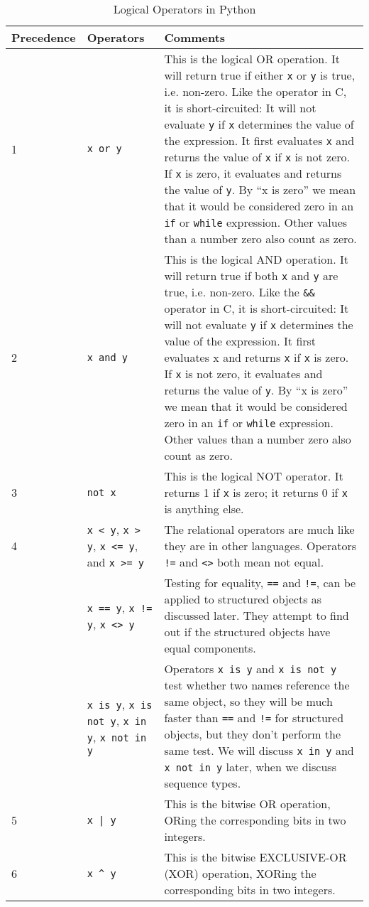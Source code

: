 \begin{longtable}{l|p{3cm}|p{7cm}}
\caption{Logical Operators in Python}
\label{table:logical-operators-python}\\
%
\toprule
Precedence & Operators & Comments \\
\midrule
  1 & \texttt{x or y} &  This is the logical OR operation.
It will return true if either \texttt{x} or \texttt{y} is true, i.e.
non-zero. Like the \texttt{\textbar{}\textbar{}} operator in C, it is
short-circuited: It will not evaluate \texttt{y} if \texttt{x} determines
the value of the expression. It first evaluates \texttt{x} and returns the
value of \texttt{x} if \texttt{x} is not zero. If \texttt{x} is zero, it
evaluates and returns the value of \texttt{y}. By ``x is zero'' we mean
that it would be considered zero in an \texttt{if} or \texttt{while}
expression. Other values than a number zero also count as zero. \\
%
\midrule
  2 & \texttt{x and y} & This is the logical AND operation.
It will return true if both \texttt{x} and \texttt{y} are true, i.e.
non-zero. Like the \texttt{\&\&} operator in C, it is short-circuited: It
will not evaluate \texttt{y} if \texttt{x} determines the value of the
expression. It first evaluates x and returns \texttt{x} if \texttt{x} is
zero. If \texttt{x} is not zero, it evaluates and returns the value of
\texttt{y}. By ``x is zero'' we mean that it would be considered zero in
an \texttt{if} or \texttt{while} expression. Other values than a number zero
also count as zero. \\
%
\midrule
  3 & \texttt{not x} & This is the logical NOT operator. 
It returns 1 if \texttt{x} is zero; it returns 0 if \texttt{x} is anything
else. \\
%
\midrule
  4 & \verb"x < y", \verb"x > y", \verb"x <= y", and \verb"x >= y"  & The relational operators are much
like they are in other languages. Operators \verb"!=" and \verb"<>" both mean not equal. \\
%
   & \verb"x == y", \verb"x != y", \verb"x <> y"  & Testing for equality, \verb"==" and \verb"!=", can be applied to structured objects as discussed later.
They attempt to find out if the structured objects have equal
components. \\
%
   & \verb"x is y", \verb"x is not y", \verb"x in y", \verb"x not in y"  & Operators \verb"x is y" and \verb"x is not y"
test whether two names reference the same object, so they will be much
faster than \verb"==" and \verb"!=" for structured objects, but they don't perform the
same test.  We will discuss \verb"x in y" and \verb"x not in y" later, when we discuss sequence types.\\
%
\midrule
  5 & \verb"x | y" &  This is the bitwise OR operation,
ORing the corresponding bits in two integers. \\
%
\midrule
  6  & \verb"x ^ y" & This is the bitwise EXCLUSIVE-OR (XOR) operation, XORing the corresponding bits in two integers. \\
%
\midrule


\end{longtable}
